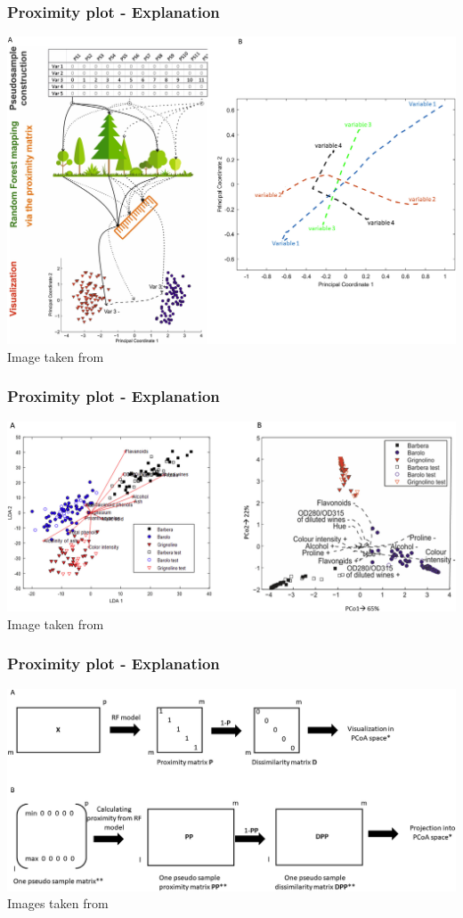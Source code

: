 \documentclass[compress]{beamer}
\begin{document}
\begin{frame}
\frametitle{Proximity plot - Explanation}
\begin{center}
\includegraphics[width=0.8\linewidth]{Pic/Prox_explanation.jpg}\\
Image taken from \cite{blanchet2020constructing}
\end{center}
\end{frame}

\begin{frame}
\begin{center}
\frametitle{Proximity plot - Explanation}
\includegraphics[width=0.8\linewidth]{Pic/Prox_explanation_3.jpg}\\
Image taken from \cite{blanchet2020constructing}
\end{center}
\end{frame}

\begin{frame}
\begin{center}
\frametitle{Proximity plot - Explanation}
\includegraphics[width=0.8\linewidth]{Pic/Prox_explanation_2.jpg}\\
Images taken from \cite{blanchet2020constructing}
\end{center}
\end{frame}
\end{document}

